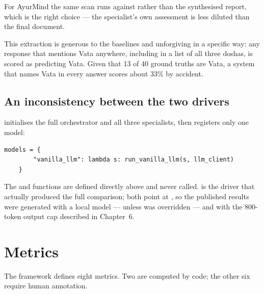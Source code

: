 For AyurMind the same scan runs against  rather than the synthesised report, which is the right choice --- the specialist's own assessment is less diluted than the final document.

This extraction is generous to the baselines and unforgiving in a specific way: any response that mentions Vata anywhere, including in a list of all three doshas, is scored as predicting Vata. Given that 13 of 40 ground truths are Vata, a system that names Vata in every answer scores about 33\% by accident.

\subsection{An inconsistency between the two drivers}

 initialises the full orchestrator and all three specialists, then registers only one model:

\begin{lstlisting}[style=py,firstnumber=167]
    models = {
        "vanilla_llm": lambda s: run_vanilla_llm(s, llm_client)
    }
\end{lstlisting}

The  and  functions are defined directly above and never called.  is the driver that actually produced the full comparison; both point at , so the published results were generated with a local model ---  unless  was overridden --- and with the 800-token output cap described in Chapter~6.

\section{Metrics}

The framework defines eight metrics. Two are computed by code; the other six require human annotation.

